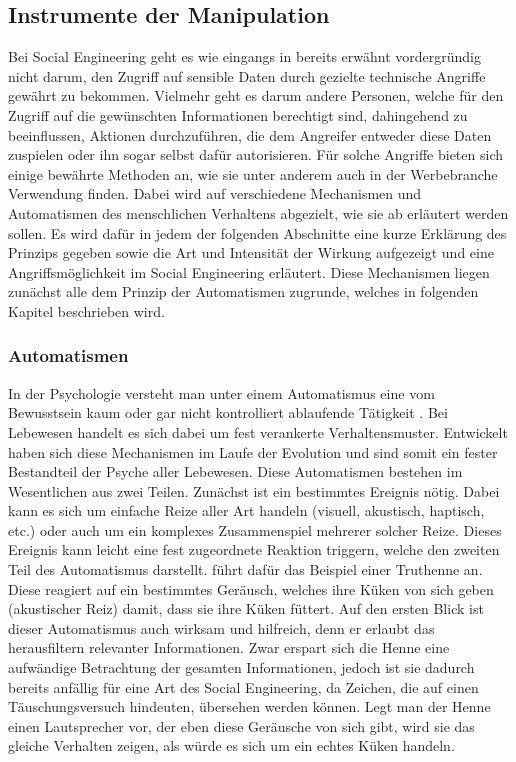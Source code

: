 \subsection{Instrumente der Manipulation}\label{sec:instrumente_der_manipulation}

Bei Social Engineering geht es wie eingangs in  bereits erwähnt vordergründig nicht darum, den Zugriff auf sensible Daten durch gezielte technische Angriffe gewährt zu bekommen.
Vielmehr geht es darum andere Personen, welche für den Zugriff auf die gewünschten Informationen berechtigt sind, dahingehend zu beeinflussen, Aktionen durchzuführen, die dem Angreifer entweder diese Daten zuspielen oder ihn sogar selbst dafür autorisieren.
Für solche Angriffe bieten sich einige bewährte Methoden an, wie sie unter anderem auch in der Werbebranche
Verwendung finden.
Dabei wird auf verschiedene Mechanismen und Automatismen des menschlichen Verhaltens abgezielt, wie sie ab  erläutert werden sollen.
Es wird dafür in jedem der folgenden Abschnitte eine kurze Erklärung des Prinzips gegeben sowie die Art und
Intensität der Wirkung aufgezeigt und eine Angriffsmöglichkeit im Social Engineering erläutert.
Diese Mechanismen liegen zunächst alle dem Prinzip der Automatismen zugrunde, welches in folgenden Kapitel beschrieben wird.

\subsubsection{Automatismen}\label{sec:automatismen}
In der Psychologie versteht man unter einem Automatismus eine vom Bewusstsein kaum oder gar nicht kontrolliert ablaufende Tätigkeit \citep{duden}.
Bei Lebewesen handelt es sich dabei um fest verankerte Verhaltensmuster.
Entwickelt haben sich diese Mechanismen im Laufe der Evolution und sind somit ein fester Bestandteil der Psyche aller Lebewesen.
Diese Automatismen bestehen im Wesentlichen aus zwei Teilen.
Zunächst ist ein bestimmtes Ereignis nötig.
Dabei kann es sich um einfache Reize aller Art handeln (visuell, akustisch, haptisch, etc.) oder auch um ein komplexes Zusammenspiel mehrerer solcher Reize.
Dieses Ereignis kann leicht eine fest zugeordnete Reaktion triggern, welche den zweiten Teil des Automatismus darstellt.
\citep{cialdini} führt dafür das Beispiel einer Truthenne an.
Diese reagiert auf ein bestimmtes Geräusch, welches ihre Küken von sich geben (akustischer Reiz) damit, dass sie ihre Küken füttert.
Auf den ersten Blick ist dieser Automatismus auch wirksam und hilfreich, denn er erlaubt das herausfiltern relevanter Informationen.
Zwar erspart sich die Henne eine aufwändige Betrachtung der gesamten Informationen, jedoch ist sie dadurch bereits anfällig für eine Art des Social Engineering, da Zeichen, die auf einen Täuschungsversuch hindeuten, übersehen werden können.
Legt man der Henne einen Lautsprecher vor, der eben diese Geräusche von sich gibt, wird sie das gleiche Verhalten zeigen, als würde es sich um ein echtes Küken handeln.

